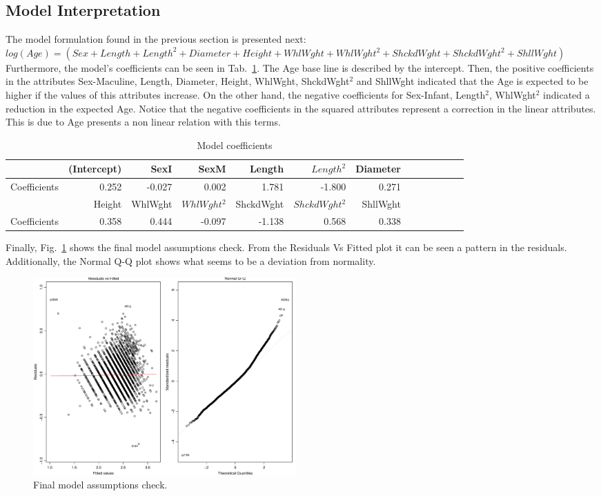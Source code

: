 \documentclass[10pt, paper=a4]{article}
\begin{document}
\subsection{Model Interpretation}
The model formulation found in the previous section is presented next:\\

$log(Age)= (Sex + Length + Length^2 + Diameter +Height + WhlWght + WhlWght^2 + ShckdWght + ShckdWght^2 +ShllWght)$\\

Furthermore, the model's coefficients can be seen in
Tab.~\ref{tab:modelcoefficients}. The Age base line is described by
the intercept. Then, the positive coefficients in the attributes
Sex-Maculine, Length, Diameter, Height, WhlWght, ShckdWght$^2$ and
ShllWght indicated that the Age is expected to be higher if the values
of this attributes increase. On the other hand, the negative
coefficients for Sex-Infant, Length$^2$, WhlWght$^2$ indicated a
reduction in the expected Age. Notice that the negative coefficients
in the squared attributes represent a correction in the linear
attributes. This is due to Age presents a non linear relation with
this terms.

\newpage
\begin{table}[ht]
\centering
\begin{tabular}{rrrrrrrrrrrrr}
  \hline
 & (Intercept) & SexI & SexM & Length & $Length^2$ & Diameter \\ 
 \hline
 Coefficients & 0.252 & -0.027 & 0.002 & 1.781 & -1.800 & 0.271 \\
 \hline
 & Height & WhlWght & $WhlWght^2$ & ShckdWght & $ShckdWght^2$ & ShllWght \\ 
  \hline
 Coefficients & 0.358 & 0.444 & -0.097 & -1.138 & 0.568 & 0.338 \\ 
   \hline
\end{tabular}
\caption{Model coefficients}
\label{tab:modelcoefficients}
\end{table}

Finally, Fig.~\ref{fig:finalmodelcheck} shows the final model
assumptions check. From the Residuals Vs Fitted plot it can be seen a
pattern in the residuals. Additionally, the Normal Q-Q plot shows what
seems to be a deviation from normality.

\begin{figure}[h]
  \centering
  \includegraphics[width = 0.49\textwidth]{finalmodelcheck.pdf}
  \caption{Final model assumptions check.}
  \label{fig:finalmodelcheck}
\end{figure}
\end{document}
